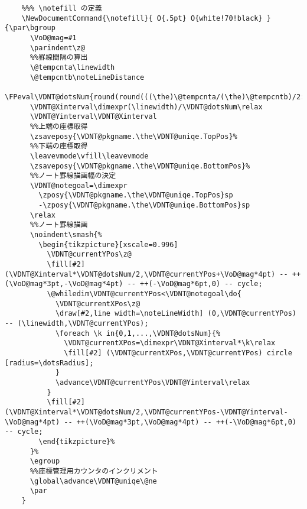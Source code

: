 \documentclass[a4paper,12pt]{article}
\begin{document}
\begin{lstlisting}
    %%% \notefill の定義
    \NewDocumentCommand{\notefill}{ O{.5pt} O{white!70!black} }{\par\bgroup
      \VoD@mag=#1
      \parindent\z@
      %%罫線間隔の算出
      \@tempcnta\linewidth
      \@tempcntb\noteLineDistance
      \FPeval\VDNT@dotsNum{round(round(((\the)\@tempcnta/(\the)\@tempcntb)/2:0)*2:0)}%
      \VDNT@Xinterval\dimexpr(\linewidth)/\VDNT@dotsNum\relax
      \VDNT@Yinterval\VDNT@Xinterval
      %%上端の座標取得
      \zsaveposy{\VDNT@pkgname.\the\VDNT@uniqe.TopPos}%
      %%下端の座標取得
      \leavevmode\vfill\leavevmode
      \zsaveposy{\VDNT@pkgname.\the\VDNT@uniqe.BottomPos}%
      %%ノート罫線描画幅の決定
      \VDNT@notegoal=\dimexpr
        \zposy{\VDNT@pkgname.\the\VDNT@uniqe.TopPos}sp
        -\zposy{\VDNT@pkgname.\the\VDNT@uniqe.BottomPos}sp
      \relax
      %%ノート罫線描画
      \noindent\smash{%
        \begin{tikzpicture}[xscale=0.996]
          \VDNT@currentYPos\z@
          \fill[#2] (\VDNT@Xinterval*\VDNT@dotsNum/2,\VDNT@currentYPos+\VoD@mag*4pt) -- ++(\VoD@mag*3pt,-\VoD@mag*4pt) -- ++(-\VoD@mag*6pt,0) -- cycle;
          \@whiledim\VDNT@currentYPos<\VDNT@notegoal\do{
            \VDNT@currentXPos\z@
            \draw[#2,line width=\noteLineWidth] (0,\VDNT@currentYPos) -- (\linewidth,\VDNT@currentYPos);
            \foreach \k in{0,1,...,\VDNT@dotsNum}{%
              \VDNT@currentXPos=\dimexpr\VDNT@Xinterval*\k\relax
              \fill[#2] (\VDNT@currentXPos,\VDNT@currentYPos) circle [radius=\dotsRadius];
            }
            \advance\VDNT@currentYPos\VDNT@Yinterval\relax
          }
          \fill[#2] (\VDNT@Xinterval*\VDNT@dotsNum/2,\VDNT@currentYPos-\VDNT@Yinterval-\VoD@mag*4pt) -- ++(\VoD@mag*3pt,\VoD@mag*4pt) -- ++(-\VoD@mag*6pt,0) -- cycle;
        \end{tikzpicture}%
      }%
      \egroup
      %%座標管理用カウンタのインクリメント
      \global\advance\VDNT@uniqe\@ne
      \par
    }



\end{lstlisting}
\end{document}
